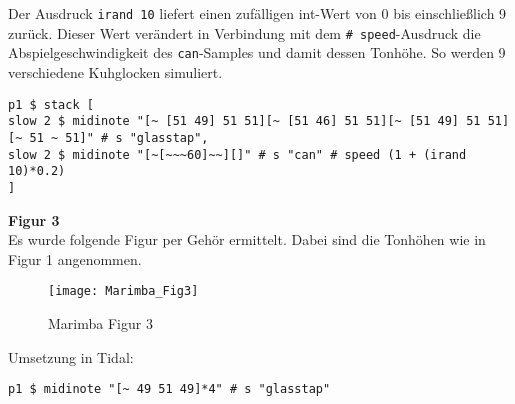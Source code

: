 \documentclass[
10pt, %
a4paper, %
oneside, %
headinclude,footinclude, %
BCOR5mm, %
]{scrartcl}
\begin{document}
\noindent Der Ausdruck \verb|irand 10| \cite{tid7} liefert einen zufälligen int-Wert von 0 bis einschließlich 9 zurück. Dieser Wert verändert in Verbindung mit dem \verb|# speed|-Ausdruck\cite{tid8} die Abspielgeschwindigkeit des \verb|can|-Samples und damit dessen Tonhöhe. So werden 9 verschiedene Kuhglocken simuliert.
\begin{lstlisting}
p1 $ stack [
slow 2 $ midinote "[~ [51 49] 51 51][~ [51 46] 51 51][~ [51 49] 51 51][~ 51 ~ 51]" # s "glasstap",
slow 2 $ midinote "[~[~~~60]~~][]" # s "can" # speed (1 + (irand 10)*0.2)
]
\end{lstlisting}

\noindent \textbf{Figur 3}\\
Es wurde folgende Figur per Gehör ermittelt. Dabei sind die Tonhöhen wie in Figur 1 angenommen.
\begin{figure}[h]
	\centering 
	\texttt{[image: Marimba\_Fig3]} 
	\caption{Marimba Figur 3}
\end{figure}

\noindent Umsetzung in Tidal:
\begin{lstlisting}
p1 $ midinote "[~ 49 51 49]*4" # s "glasstap"
\end{lstlisting}
\end{document}
